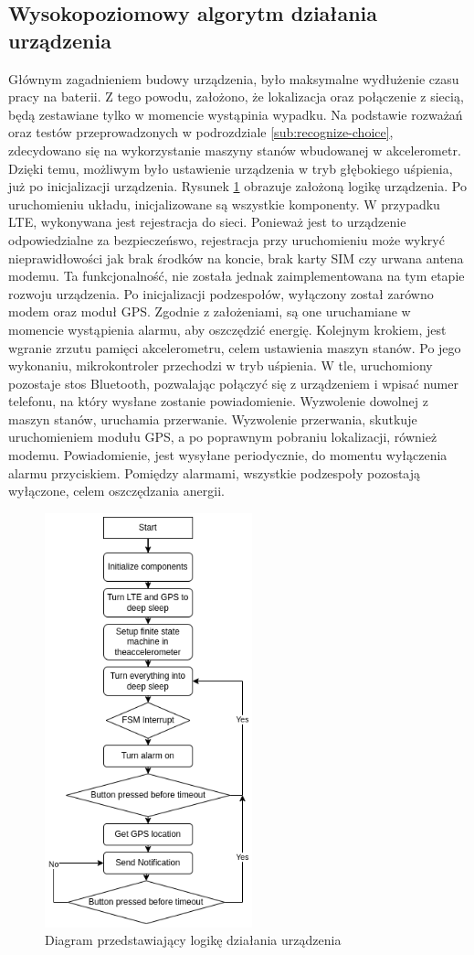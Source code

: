 \subsection{Wysokopoziomowy algorytm działania urządzenia}
Głównym zagadnieniem budowy urządzenia, było maksymalne wydłużenie czasu pracy na baterii. Z tego powodu, założono, że lokalizacja oraz połączenie z siecią, będą zestawiane tylko w momencie wystąpinia wypadku. Na podstawie rozważań oraz testów przeprowadzonych w podrozdziale \ref{sub:recognize-choice}, zdecydowano się na wykorzystanie maszyny stanów wbudowanej w akcelerometr. Dzięki temu, możliwym było ustawienie urządzenia w tryb głębokiego uśpienia, już po inicjalizacji urządzenia.
Rysunek \ref{img:app_logic} obrazuje założoną logikę urządzenia. Po uruchomieniu układu, inicjalizowane są wszystkie komponenty. W przypadku LTE, wykonywana jest rejestracja do sieci. Ponieważ jest to urządzenie odpowiedzialne za bezpieczeńswo, rejestracja przy uruchomieniu może wykryć nieprawidłowości jak brak środków na koncie, brak karty SIM czy urwana antena modemu. Ta funkcjonalność, nie została jednak zaimplementowana na tym etapie rozwoju urządzenia. Po inicjalizacji podzespołów, wyłączony został zarówno modem oraz moduł GPS. Zgodnie z założeniami, są one uruchamiane w momencie wystąpienia alarmu, aby oszczędzić energię. Kolejnym krokiem, jest wgranie zrzutu pamięci akcelerometru, celem ustawienia maszyn stanów. Po jego wykonaniu, mikrokontroler przechodzi w tryb uśpienia. W tle, uruchomiony pozostaje stos Bluetooth, pozwalając połączyć się z urządzeniem i wpisać numer telefonu, na który wysłane zostanie powiadomienie. Wyzwolenie dowolnej z maszyn stanów, uruchamia przerwanie. Wyzwolenie przerwania, skutkuje uruchomieniem modułu GPS, a po poprawnym pobraniu lokalizacji, również modemu. Powiadomienie, jest wysyłane periodycznie, do momentu wyłączenia alarmu przyciskiem. Pomiędzy alarmami, wszystkie podzespoły pozostają wyłączone, celem oszczędzania anergii.
\begin{figure}[h]
    \centering
    \includegraphics[width=6cm]{Graphics/APP_logic.png}
    \caption{Diagram przedstawiający logikę działania urządzenia}
    \label{img:app_logic}
\end{figure}
